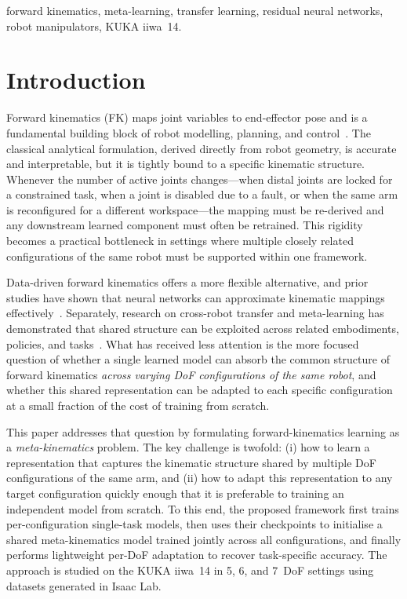 \documentclass[conference]{IEEEtran}
\begin{document}
\begin{IEEEkeywords}
forward kinematics, meta-learning, transfer learning, residual neural networks, robot manipulators, KUKA iiwa~14.
\end{IEEEkeywords}

\section{Introduction}

Forward kinematics (FK) maps joint variables to end-effector pose and is a fundamental building block of robot modelling, planning, and control~\cite{siciliano2009}. The classical analytical formulation, derived directly from robot geometry, is accurate and interpretable, but it is tightly bound to a specific kinematic structure. Whenever the number of active joints changes---when distal joints are locked for a constrained task, when a joint is disabled due to a fault, or when the same arm is reconfigured for a different workspace---the mapping must be re-derived and any downstream learned component must often be retrained. This rigidity becomes a practical bottleneck in settings where multiple closely related configurations of the same robot must be supported within one framework.

Data-driven forward kinematics offers a more flexible alternative, and prior studies have shown that neural networks can approximate kinematic mappings effectively~\cite{duka2014,koker2004,diprasetya2025}. Separately, research on cross-robot transfer and meta-learning has demonstrated that shared structure can be exploited across related embodiments, policies, and tasks~\cite{devin2017,chen2018,ghadirzadeh2021}. What has received less attention is the more focused question of whether a single learned model can absorb the common structure of forward kinematics \emph{across varying DoF configurations of the same robot}, and whether this shared representation can be adapted to each specific configuration at a small fraction of the cost of training from scratch.

This paper addresses that question by formulating forward-kinematics learning as a \emph{meta-kinematics} problem. The key challenge is twofold: (i) how to learn a representation that captures the kinematic structure shared by multiple DoF configurations of the same arm, and (ii) how to adapt this representation to any target configuration quickly enough that it is preferable to training an independent model from scratch. To this end, the proposed framework first trains per-configuration single-task models, then uses their checkpoints to initialise a shared meta-kinematics model trained jointly across all configurations, and finally performs lightweight per-DoF adaptation to recover task-specific accuracy. The approach is studied on the KUKA iiwa~14 in 5, 6, and 7~DoF settings using datasets generated in Isaac Lab.
\end{document}
